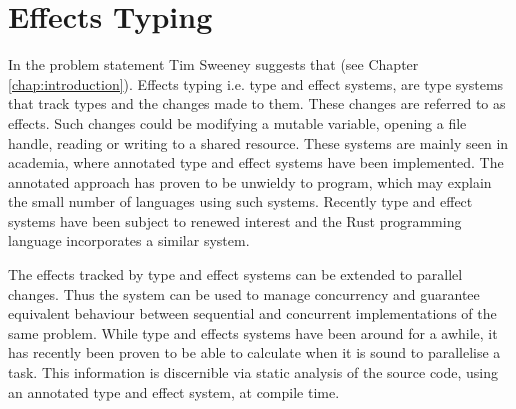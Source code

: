 \section{Effects Typing}
In the problem statement Tim Sweeney suggests that  (see Chapter \ref{chap:introduction}). Effects typing i.e. type and effect systems, are type systems that track types and the changes made to them\cite{nielson1999type}. These changes are referred to as effects. Such changes could be modifying a mutable variable, opening a file handle, reading or writing to a shared resource. These systems are mainly seen in academia, where annotated type and effect systems have been implemented. The annotated approach has proven to be unwieldy to program\needcite, which may explain the small number of languages using such systems. Recently type and effect systems have been subject to renewed interest and the Rust programming language incorporates a similar system\cite{rust:lang}.

The effects tracked by type and effect systems can be extended to parallel changes. Thus the system can be used to manage concurrency and guarantee equivalent behaviour between sequential and concurrent implementations of the same problem\cite{krogh2017relational}. While type and effects systems have been around for a awhile, it has recently been proven to be able to calculate when it is sound to parallelise a task\cite{birkedal2012concurrent}. This information is discernible via static analysis of the source code, using an annotated type and effect system, at compile time.
